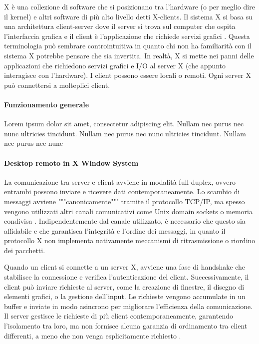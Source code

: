 \documentclass[12pt,a4paper,openright,twoside]{book}
\begin{document}
X è una collezione di software che si posizionano tra l'hardware (o per meglio dire il kernel) e altri software di più alto livello detti X-clients. Il sistema X si basa su una architettura client-server dove il server si trova sul computer che ospita l'interfaccia grafica e il client è l'applicazione che richiede servizi grafici \cite{scheifler1986x}. Questa terminologia può sembrare controintuitiva in quanto chi non ha familiarità con il sistema X potrebbe pensare che sia invertita. In realtà, X si mette nei panni delle applicazioni che richiedono servizi grafici e I/O al server X (che appunto interagisce con l'hardware).
I client possono essere locali o remoti. Ogni server X può connettersi a molteplici client.

\paragraph{Funzionamento generale}

Lorem ipsum dolor sit amet, consectetur adipiscing elit. Nullam nec purus nec nunc ultricies tincidunt. Nullam nec purus nec nunc ultricies tincidunt. Nullam nec purus nec nunc

\paragraph{Desktop remoto in X Window System}

La comunicazione tra server e client avviene in modalità full-duplex, ovvero entrambi possono inviare e ricevere dati contemporaneamente. Lo scambio di messaggi avviene """canonicamente""" tramite il protocollo TCP/IP, ma spesso vengono utilizzati altri canali comunicativi come Unix domain sockets o memoria condivisa \cite{coopersmith2024x}. Indipendentemente dal canale utilizzato, è necessario che questo sia affidabile e che garantisca l'integrità e l'ordine dei messaggi, in quanto il protocollo X non implementa nativamente meccanismi di ritrasmissione o riordino dei pacchetti.

Quando un client si connette a un server X, avviene una fase di handshake che stabilisce la connessione e verifica l'autenticazione del client. Successivamente, il client può inviare richieste al server, come la creazione di finestre, il disegno di elementi grafici, o la gestione dell'input. Le richieste vengono accumulate in un buffer e inviate in modo asincrono per migliorare l'efficienza della comunicazione. Il server gestisce le richieste di più client contemporaneamente, garantendo l'isolamento tra loro, ma non fornisce alcuna garanzia di ordinamento tra client differenti, a meno che non venga esplicitamente richiesto \cite{coopersmith2024x}.
\end{document}
